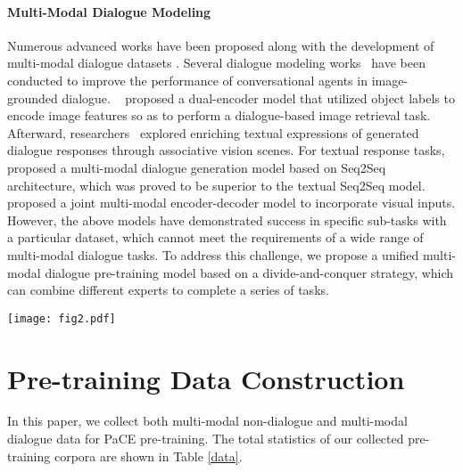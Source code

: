 \documentclass[11pt]{article}
\newcommand*{\SmallImage}[1]{\texttt{[image: \#1]}}
\newcommand*{\Image}[1]{\texttt{[image: \#1]}}\usepackage{inconsolata}
\begin{document}
\paragraph{Multi-Modal Dialogue Modeling}
Numerous advanced works have been proposed along with the development of multi-modal dialogue datasets \cite{das2017visual,mostafazadeh2017image,shuster2018image,zang2021photochat,zheng2021mmchat,kottur2021simmc,liao2021mmconv,feng2022mmdialog}. Several dialogue modeling works~\citep{qi2020two,lee2021constructing} have been conducted to improve the performance of conversational agents in image-grounded dialogue. ~\citet{zang2021photochat} proposed a dual-encoder model that utilized object labels to encode image features so as to perform a dialogue-based image retrieval task. 
Afterward, researchers~\citep{yang2021open,chen2021learning} explored enriching textual expressions of generated dialogue responses through associative vision scenes. For textual response tasks, ~\citet{zheng2021mmchat} proposed a multi-modal dialogue generation model based on Seq2Seq architecture, which was proved to be superior to the textual Seq2Seq model. ~\citet{lee2022learning} proposed a joint multi-modal encoder-decoder model to incorporate visual inputs.
However, the above models have demonstrated success in specific sub-tasks with a particular dataset, which cannot meet the requirements of a wide range of multi-modal dialogue tasks. To address this challenge, we propose a unified multi-modal dialogue pre-training model based on a divide-and-conquer strategy, which can combine different experts to complete a series of tasks.

\begin{figure*}[t!]
    \small
    \centering
    \texttt{[image: fig2.pdf]}
    \caption{Three-stage training based on different combinations of experts, where the \Image{icon/icon3.pdf} represents  multi-modal non-dialog data and works mainly in the first stage, while the \Image{icon/icon2.pdf} represents multi-modal dialog  data and works in the second and third stages. The \SmallImage{icon/cc.pdf} represents the caption of the input image.} 
    \label{method}
\end{figure*}

\section{Pre-training Data Construction}
In this paper, we collect both multi-modal non-dialogue and 
multi-modal dialogue data for PaCE pre-training.
The total statistics of our collected pre-training corpora are shown in Table \ref{data}. 
\end{document}

